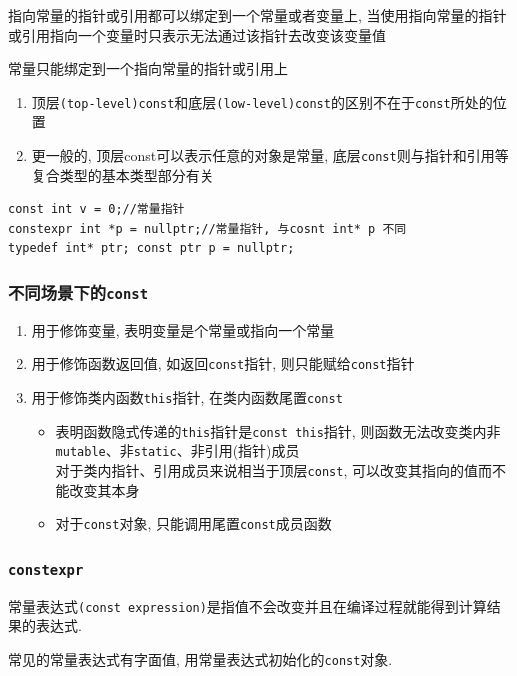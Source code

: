指向常量的指针或引用都可以绑定到一个常量或者变量上, 当使用指向常量的指针或引用指向一个变量时只表示无法通过该指针去改变该变量值

常量只能绑定到一个指向常量的指针或引用上

\begin{enumerate}
	\item 顶层{\tt(top-level)const}和底层{\tt(low-level)const}的区别不在于{\tt const}所处的位置
	\item 更一般的, 顶层const可以表示任意的对象是常量, 底层{\tt const}则与指针和引用等复合类型的基本类型部分有关
\end{enumerate}

\begin{lstlisting}[title=三种{\tt const}在开头的顶层{\tt const}]
const int v = 0;//常量指针
constexpr int *p = nullptr;//常量指针, 与cosnt int* p 不同
typedef int* ptr; const ptr p = nullptr;
\end{lstlisting}

\subsubsection{不同场景下的{\tt const}}
\begin{enumerate}
	\item 用于修饰变量, 表明变量是个常量或指向一个常量
	\item 用于修饰函数返回值, 如返回{\tt const}指针, 则只能赋给{\tt const}指针
	\item 用于修饰类内函数{\tt this}指针, 在类内函数尾置{\tt const}
	\begin{itemize}
		\item 表明函数隐式传递的{\tt this}指针是{\tt const this}指针,
				则函数无法改变类内非{\tt mutable}、非{\tt static}、非引用(指针)成员
			 \\ 对于类内指针、引用成员来说相当于顶层{\tt const}, 可以改变其指向的值而不能改变其本身
		\item 对于{\tt const}对象, 只能调用尾置{\tt const}成员函数
	\end{itemize}
\end{enumerate}
\subsubsection{\tt constexpr}
常量表达式{\tt (const expression)}是指值不会改变并且在编译过程就能得到计算结果的表达式.

常见的常量表达式有字面值, 用常量表达式初始化的{\tt const}对象.

